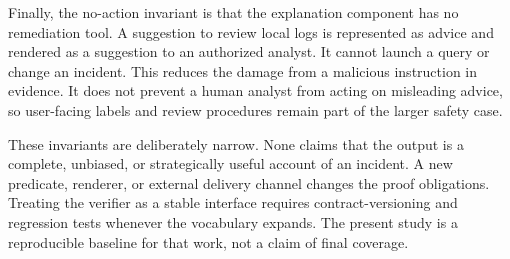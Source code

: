 Finally, the no-action invariant is that the explanation component has no remediation tool. A suggestion to review local logs is represented as advice and rendered as a suggestion to an authorized analyst. It cannot launch a query or change an incident. This reduces the damage from a malicious instruction in evidence. It does not prevent a human analyst from acting on misleading advice, so user-facing labels and review procedures remain part of the larger safety case.

These invariants are deliberately narrow. None claims that the output is a complete, unbiased, or strategically useful account of an incident. A new predicate, renderer, or external delivery channel changes the proof obligations. Treating the verifier as a stable interface requires contract-versioning and regression tests whenever the vocabulary expands. The present study is a reproducible baseline for that work, not a claim of final coverage.
